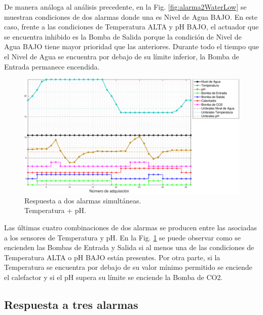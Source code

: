 De manera análoga al análisis precedente, en la Fig. \ref{fig:alarma2WaterLow} se muestran condiciones de dos alarmas donde una es Nivel de Agua BAJO.  En este caso, frente a las condiciones de Temperatura ALTA y pH BAJO, el actuador que se encuentra inhibido es la Bomba de Salida porque la condición de Nivel de Agua BAJO tiene mayor prioridad que las anteriores.  Durante todo el tiempo que el Nivel de Agua se encuentra por debajo de su límite inferior, la Bomba de Entrada permanece encendida.

\begin{figure}
\centering
    \includegraphics[width=\textwidth]{./Figures/plot2Temp.pdf}
	\caption{Respuesta a dos alarmas simultáneas.\\ Temperatura + pH.}
	\label{fig:alarma2Temp}
\end{figure}

Las últimas cuatro combinaciones de dos alarmas se producen entre las asociadas a los sensores de Temperatura y pH.  En la Fig. \ref{fig:alarma2Temp} se puede observar como se encienden las Bombas de Entrada y Salida si al menos una de las condiciones de Temperatura ALTA o pH BAJO están presentes.  Por otra parte, si la Temperatura se encuentra por debajo de su valor mínimo permitido se enciende el calefactor y si el pH supera su límite se enciende la Bomba de CO2.


\subsection{Respuesta a tres alarmas}
\label{sec:3alarma}

